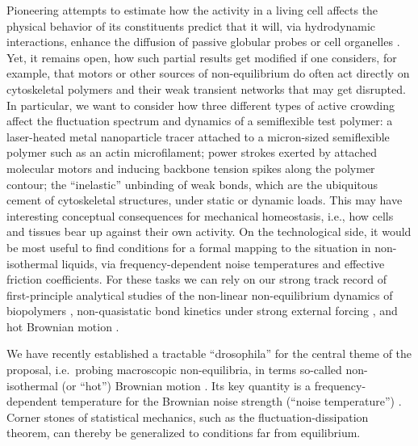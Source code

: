 \begin{workpackage}
\begin{tasklist}
\begin{task}[title=Active Crowding,id=task2,lead=Leipzig,wphases=0-48!0.2]
Pioneering attempts to estimate how the activity in a living cell affects the physical behavior
of its constituents predict that it will, via hydrodynamic interactions, enhance the diffusion of
passive globular probes or cell organelles \cite{mikhailov-kapral:2015}.
%
Yet, it remains open, how such partial results get modified if one considers, for example, that motors or
other sources of non-equilibrium do often act directly on cytoskeletal polymers and their
weak transient networks that may get disrupted.
%
In particular, we want to consider how three different types of active
crowding affect the fluctuation spectrum and dynamics of a semiflexible test polymer: a
laser-heated metal nanoparticle tracer attached to a micron-sized semiflexible polymer such
as an actin microfilament; power strokes exerted by attached molecular
motors and inducing backbone tension spikes along the polymer contour; the ``inelastic'' \cite{gralka-kroy:2015}
unbinding of weak bonds, which are the ubiquitous cement of
cytoskeletal structures, under static or dynamic loads.
%
This may have interesting conceptual consequences for mechanical homeostasis, i.e., how cells and tissues bear up against 
their own activity.   
%
On the technological side, it would be most useful to find conditions for a formal mapping to the situation in 
non-isothermal liquids, via frequency-dependent noise temperatures and effective friction coefficients.
%
For these tasks we can rely on our strong track record of first-principle analytical studies
of the non-linear non-equilibrium dynamics of biopolymers \cite{otto-etal:2013}, non-quasistatic bond kinetics
under strong external forcing \cite{bullerjahn-sturm-kroy:2014}, and hot Brownian motion \cite{rings-etal:2010}.

\end{task}


\begin{task}[title=Noise Temperature,id=task3,lead=Leipzig,wphases=0-24!0.5]
We have recently established a tractable ``drosophila'' for the central theme of the
proposal, i.e.\ probing macroscopic non-equilibria, in terms so-called non-isothermal (or
``hot'') Brownian motion \cite{rings-etal:2010,chakraborty-etal:2011}.
%
Its key quantity is a frequency-dependent
temperature for the Brownian noise strength (``noise temperature'') \cite{falasco-etal:2014}.
%
Corner stones of statistical mechanics, such as the fluctuation-dissipation theorem, can
thereby be generalized to conditions far from equilibrium.  


\end{task}
\end{tasklist}
\end{workpackage}

